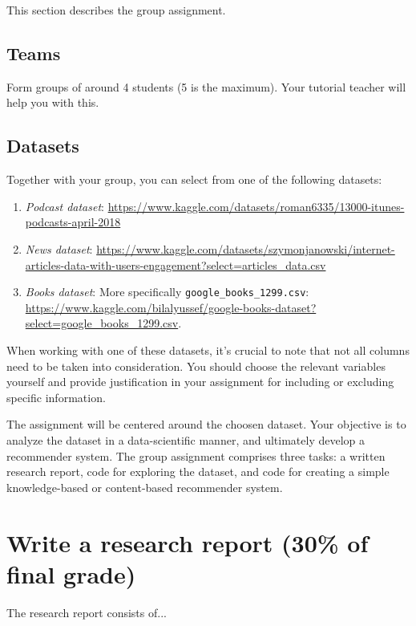 This section describes the group assignment. 

\subsection*{Teams}

Form groups of around 4 students (5 is the maximum). Your tutorial teacher will help you with this.

\subsection*{Datasets}
Together with your group, you can select from one of the following datasets:

\begin{enumerate}
	\item \emph{Podcast dataset}:  \url{https://www.kaggle.com/datasets/roman6335/13000-itunes-podcasts-april-2018}
	\item \emph{News dataset}: \url{https://www.kaggle.com/datasets/szymonjanowski/internet-articles-data-with-users-engagement?select=articles_data.csv}
	\item \emph{Books dataset}: More specifically \texttt{google\_books\_1299.csv}: \url{https://www.kaggle.com/bilalyussef/google-books-dataset?select=google_books_1299.csv}. 
\end{enumerate}

When working with one of these datasets, it's crucial to note that not all columns need to be taken into consideration. You should choose the relevant variables yourself and provide justification in your assignment for including or excluding specific information.

The assignment will be centered around the choosen dataset. Your objective is to analyze the dataset in a data-scientific manner, and ultimately develop a recommender system.
The group assignment comprises three tasks: a written research report, code for exploring the dataset, and code for creating a simple knowledge-based or content-based recommender system. 

\section{Write a research report (30\% of final grade)}

The research report consists of...

